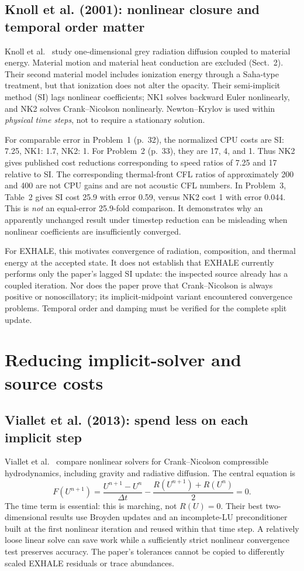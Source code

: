 \documentclass[english,a4paper]{my_memo}
\begin{document}
\subsection{Knoll et al. (2001): nonlinear closure and temporal order matter}
Knoll et al.\ \cite{knoll} study one-dimensional grey radiation diffusion coupled to material energy. Material motion and material heat conduction are excluded (Sect.~2). Their second material model includes ionization energy through a Saha-type treatment, but that ionization does not alter the opacity. Their semi-implicit method (SI) lags nonlinear coefficients; NK1 solves backward Euler nonlinearly, and NK2 solves Crank--Nicolson nonlinearly. Newton--Krylov is used within \emph{physical time steps}, not to require a stationary solution.

For comparable error in Problem~1 (p.~32), the normalized CPU costs are SI: 7.25, NK1: 1.7, NK2: 1. For Problem~2 (p.~33), they are 17, 4, and 1. Thus NK2 gives published cost reductions corresponding to speed ratios of 7.25 and 17 relative to SI. The corresponding thermal-front CFL ratios of approximately 200 and 400 are not CPU gains and are not acoustic CFL numbers. In Problem~3, Table~2 gives SI cost 25.9 with error 0.59, versus NK2 cost 1 with error 0.044. This is \emph{not} an equal-error 25.9-fold comparison. It demonstrates why an apparently unchanged result under timestep reduction can be misleading when nonlinear coefficients are insufficiently converged.

For EXHALE, this motivates convergence of radiation, composition, and thermal energy at the accepted state. It does not establish that EXHALE currently performs only the paper's lagged SI update: the inspected source already has a coupled iteration. Nor does the paper prove that Crank--Nicolson is always positive or nonoscillatory; its implicit-midpoint variant encountered convergence problems. Temporal order and damping must be verified for the complete split update.

\section{Reducing implicit-solver and source costs}
\subsection{Viallet et al. (2013): spend less on each implicit step}
Viallet et al.\ \cite{viallet13} compare nonlinear solvers for Crank--Nicolson compressible hydrodynamics, including gravity and radiative diffusion. The central equation is
\begin{equation}
 F(U^{n+1})=\frac{U^{n+1}-U^n}{\Delta t}
 -\frac{R(U^{n+1})+R(U^n)}{2}=0.
\end{equation}
The time term is essential: this is marching, not $R(U)=0$. Their best two-dimensional results use Broyden updates and an incomplete-LU preconditioner built at the first nonlinear iteration and reused within that time step. A relatively loose linear solve can save work while a sufficiently strict nonlinear convergence test preserves accuracy. The paper's tolerances cannot be copied to differently scaled EXHALE residuals or trace abundances.
\end{document}
